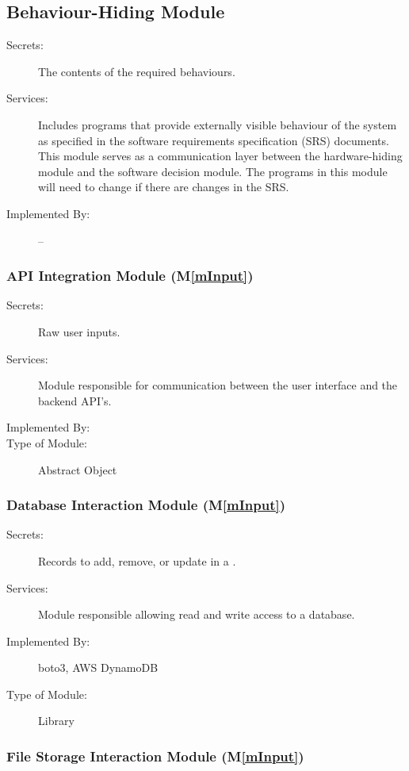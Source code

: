 \documentclass[12pt, titlepage]{article}
\newcommand{\mref}[1]{M\ref{#1}}
\begin{document}
\subsection{Behaviour-Hiding Module}

\begin{description}
  \item[Secrets:]The contents of the required behaviours.
  \item[Services:]Includes programs that provide externally visible behaviour of
    the system as specified in the software requirements specification (SRS)
    documents. This module serves as a communication layer between the
    hardware-hiding module and the software decision module. The
    programs in this
    module will need to change if there are changes in the SRS.
  \item[Implemented By:] --
\end{description}

\subsubsection{API Integration Module (\mref{mInput})}

\begin{description}
  \item[Secrets:] Raw user inputs.
  \item[Services:] Module responsible for communication between the
    user interface and the backend API's.
  \item[Implemented By:] \progname{}
  \item[Type of Module:] Abstract Object
\end{description}

\subsubsection{Database Interaction Module (\mref{mInput})}

\begin{description}
  \item[Secrets:] Records to add, remove, or update in a .
  \item[Services:] Module responsible allowing read and write access
    to a database.
  \item[Implemented By:] boto3, AWS DynamoDB
  \item[Type of Module:] Library
\end{description}

\subsubsection{File Storage Interaction Module (\mref{mInput})}
\end{document}
